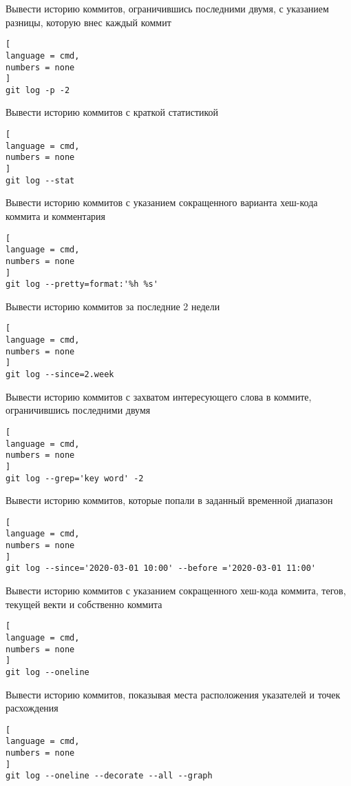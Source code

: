 \documentclass[%
	11pt,
	a4paper,
	utf8,
		]{article}
\begin{document}
Вывести историю коммитов, ограничившись последними двумя, с указанием разницы, которую внес каждый коммит

\begin{lstlisting}[
language = cmd,
numbers = none
]
git log -p -2
\end{lstlisting}

Вывести историю коммитов с краткой статистикой

\begin{lstlisting}[
language = cmd,
numbers = none
]
git log --stat
\end{lstlisting}

Вывести историю коммитов с указанием сокращенного варианта хеш-кода коммита и комментария

\begin{lstlisting}[
language = cmd,
numbers = none
]
git log --pretty=format:'%h %s'
\end{lstlisting}


Вывести историю коммитов за последние 2 недели

\begin{lstlisting}[
language = cmd,
numbers = none
]
git log --since=2.week
\end{lstlisting}


Вывести историю коммитов с захватом интересующего слова в коммите, ограничившись последними двумя

\begin{lstlisting}[
language = cmd,
numbers = none
]
git log --grep='key word' -2
\end{lstlisting}


Вывести историю коммитов, которые попали в заданный временной диапазон

\begin{lstlisting}[
language = cmd,
numbers = none
]
git log --since='2020-03-01 10:00' --before ='2020-03-01 11:00'
\end{lstlisting}


Вывести историю коммитов с указанием сокращенного хеш-кода коммита, тегов, текущей векти и собственно коммита

\begin{lstlisting}[
language = cmd,
numbers = none
]
git log --oneline
\end{lstlisting}


Вывести историю коммитов, показывая места расположения указателей и точек расхождения

\begin{lstlisting}[
language = cmd,
numbers = none
]
git log --oneline --decorate --all --graph
\end{lstlisting}
\end{document}
